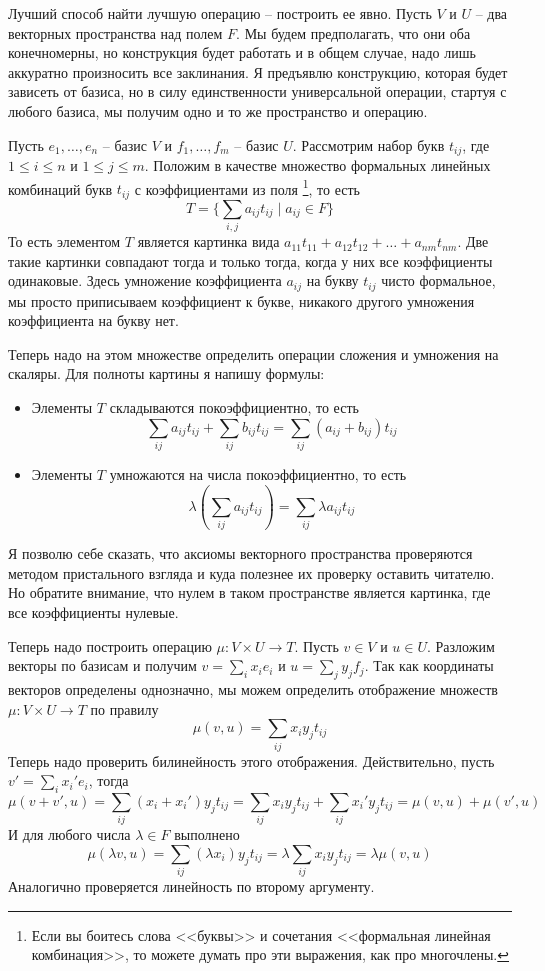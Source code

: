 Лучший способ  найти лучшую операцию -- построить ее явно.
Пусть $V$ и $U$ -- два векторных пространства над полем $F$.
Мы будем предполагать, что они оба конечномерны, но конструкция будет работать и в общем случае, надо лишь аккуратно произносить все заклинания.
Я предъявлю конструкцию, которая будет зависеть от базиса, но в силу единственности универсальной операции, стартуя с любого базиса, мы получим одно и то же пространство и операцию.

Пусть $e_1,\ldots,e_n$ -- базис $V$ и $f_1,\ldots,f_m$ -- базис $U$.
Рассмотрим набор букв $t_{ij}$, где $1\leqslant i\leqslant n$ и $1\leqslant j \leqslant m$.
Положим в качестве множество формальных линейных комбинаций букв $t_{ij}$ с коэффициентами из поля%
\footnote{Если вы боитесь слова <<буквы>> и сочетания <<формальная линейная комбинация>>, то можете думать про эти выражения, как про многочлены.},
то есть
\[
T = \{\sum_{i,j}a_{ij}t_{ij}\mid a_{ij}\in F\}
\]
То есть элементом $T$ является картинка вида $a_{11}t_{11} + a_{12}t_{12} + \ldots + a_{nm}t_{nm}$.
Две такие картинки совпадают тогда и только тогда, когда у них все коэффициенты одинаковые.
Здесь умножение коэффициента $a_{ij}$ на букву $t_{ij}$ чисто формальное, мы просто приписываем коэффициент к букве, никакого другого умножения коэффициента на букву нет.

Теперь надо на этом множестве определить операции сложения и умножения на скаляры.
Для полноты картины я напишу формулы:
\begin{itemize}
\item Элементы $T$ складываются покоэффициентно, то есть
\[
\sum_{ij}a_{ij}t_{ij} + \sum_{ij}b_{ij}t_{ij} = \sum_{ij}(a_{ij}+b_{ij})t_{ij}
\]

\item Элементы $T$ умножаются на числа покоэффициентно, то есть
\[
\lambda(\sum_{ij} a_{ij}t_{ij}) = \sum_{ij} \lambda a_{ij}t_{ij}
\]
\end{itemize}
Я позволю себе сказать, что аксиомы векторного пространства проверяются методом пристального взгляда и куда полезнее их проверку оставить читателю.
Но обратите внимание, что нулем в таком пространстве является картинка, где все коэффициенты нулевые.


Теперь надо построить операцию $\mu\colon V\times U\to T$.
Пусть $v\in V$ и $u\in U$.
Разложим векторы по базисам и получим $v = \sum_i x_i e_i$ и $u = \sum_j y_j f_j$.
Так как координаты векторов определены однозначно, мы можем определить отображение множеств $\mu\colon V\times U\to T$ по правилу
\[
\mu(v, u) = \sum_{ij}x_iy_j t_{ij}
\]
Теперь надо проверить билинейность этого отображения.
Действительно, пусть $v' = \sum_{i} x_i'e_i$, тогда
\[
\mu(v + v', u) = \sum_{ij}(x_i + x_i')y_j t_{ij} = \sum_{ij}x_iy_j t_{ij} +\sum_{ij}x_i'y_j t_{ij}  =\mu(v, u) + \mu(v', u)
\]
И для любого числа $\lambda \in F$ выполнено
\[
\mu(\lambda v, u) = \sum_{ij} (\lambda x_i)y_jt_{ij} = \lambda \sum_{ij}x_iy_jt_{ij} = \lambda\mu(v, u)
\]
Аналогично проверяется линейность по второму аргументу.

